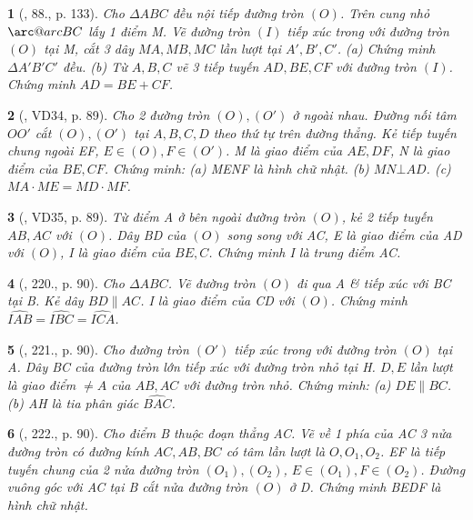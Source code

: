 \documentclass{article}
\makeatletter
\newcommand{\arc@char}{{\usefont{U}{tipa}{m}{n}\symbol{62}}}%
\newcommand{\arc}[1]{\mathpalette\arc@arc{#1}}
\newcommand{\arc@arc}[2]{%
	\sbox0{$\m@th#1#2$}%
	\vbox{
		\hbox{\resizebox{\wd0}{\height}{\arc@char}}
		\nointerlineskip
		\box0
	}%
}
\newtheorem{baitoan}{}
\makeatother
\begin{document}
\begin{baitoan}[\cite{Tuyen_Toan_9_old}, 88., p. 133]
	Cho $\Delta ABC$ đều nội tiếp đường tròn $(O)$. Trên cung nhỏ $\arc{BC}$ lấy 1 điểm M. Vẽ đường tròn $(I)$ tiếp xúc trong với đường tròn $(O)$ tại M, cắt 3 dây $MA,MB,MC$ lần lượt tại $A',B',C'$. (a) Chứng minh $\Delta A'B'C'$ đều. (b) Từ $A,B,C$ vẽ 3 tiếp tuyến $AD,BE,CF$ với đường tròn $(I)$. Chứng minh $AD = BE + CF$.
\end{baitoan}

\begin{baitoan}[\cite{Binh_Toan_9_tap_2}, VD34, p. 89]
	Cho 2 đường tròn $(O),(O')$ ở ngoài nhau. Đường nối tâm $OO'$ cắt $(O),(O')$ tại $A,B,C,D$ theo thứ tự trên đường thẳng. Kẻ tiếp tuyến chung ngoài EF, $E\in(O),F\in(O')$. M là giao điểm của $AE,DF$, N là giao điểm của $BE,CF$. Chứng minh: (a) MENF là hình chữ nhật. (b) $MN\bot AD$. (c) $MA\cdot ME = MD\cdot MF$.
\end{baitoan}

\begin{baitoan}[\cite{Binh_Toan_9_tap_2}, VD35, p. 89]
	Từ điểm A ở bên ngoài đường tròn $(O)$, kẻ 2 tiếp tuyến $AB,AC$ với $(O)$. Dây BD của $(O)$ song song với AC, E là giao điểm của AD với $(O)$, I là giao điểm của $BE,C$. Chứng minh I là trung điểm AC.
\end{baitoan}

\begin{baitoan}[\cite{Binh_Toan_9_tap_2}, 220., p. 90]
	Cho $\Delta ABC$. Vẽ đường tròn $(O)$ đi qua A \& tiếp xúc với BC tại B. Kẻ dây $BD\parallel AC$. I là giao điểm của CD với $(O)$. Chứng minh $\widehat{IAB} = \widehat{IBC} = \widehat{ICA}$.
\end{baitoan}

\begin{baitoan}[\cite{Binh_Toan_9_tap_2}, 221., p. 90]
	Cho đường tròn $(O')$ tiếp xúc trong với đường tròn $(O)$ tại A. Dây BC của đường tròn lớn tiếp xúc với đường tròn nhỏ tại H. $D,E$ lần lượt là giao điểm $\ne A$ của $AB,AC$ với đường tròn nhỏ. Chứng minh: (a) $DE\parallel BC$. (b) AH là tia phân giác $\widehat{BAC}$.
\end{baitoan}

\begin{baitoan}[\cite{Binh_Toan_9_tap_2}, 222., p. 90]
	Cho điểm B thuộc đoạn thẳng AC. Vẽ về 1 phía của AC 3 nửa đường tròn có đường kính $AC,AB,BC$ có tâm lần lượt là $O,O_1,O_2$. EF là tiếp tuyến chung của 2 nửa đường tròn $(O_1),(O_2)$, $E\in(O_1),F\in(O_2)$. Đường vuông góc với AC tại B cắt nửa đường tròn $(O)$ ở D. Chứng minh BEDF là hình chữ nhật.
\end{baitoan}
\end{document}
